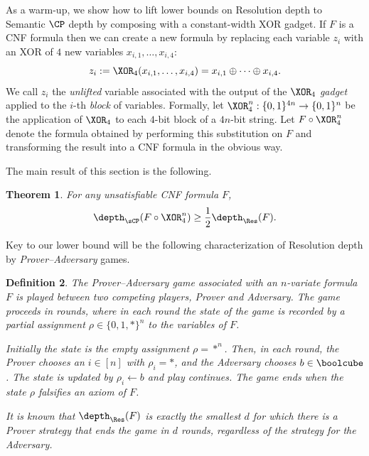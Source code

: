 \documentclass[11pt]{article}
\newtheorem{theorem}{Theorem}[section]
\newtheorem{definition}[theorem]{Definition}
\begin{document}
As a warm-up, we show how to lift lower bounds on Resolution depth to Semantic $\CP$ depth by composing with a constant-width XOR gadget.
If $F$ is a CNF formula then we can create a new formula by replacing each variable $z_i$ with an XOR of $4$ new variables $x_{i,1},\ldots, x_{i,4}$:
\[z_i := \XOR_4(x_{i,1},\ldots, x_{i,4}) = x_{i,1} \oplus \cdots \oplus x_{i,4}. \] 
We call $z_i$ the \emph{unlifted} variable associated with the output of the $\XOR_4$ \emph{gadget} applied to the $i$-th \emph{block} of variables. 
Formally, let $\XOR_4^n:\{0,1\}^{4n} \rightarrow \{0,1\}^n$ be the application of $\XOR_4$ to each $4$-bit block of a $4n$-bit string. 
Let $F \circ \XOR_4^n$ denote the formula obtained by performing this substitution on $F$ and transforming the result into a CNF formula in the obvious way.

The main result of this section is the following.
\begin{theorem}\label{thm:cp-depth-lifting}
	For any unsatisfiable CNF formula $F$, \[\depth_{\sCP}(F\circ \XOR_4^n) \geq \frac{1}{2} \depth_{\Res}(F).\]
\end{theorem}

Key to our lower bound will be the following characterization of Resolution depth by \emph{Prover--Adversary} games.

\begin{definition}\label{def:prover-adversary}
	The \emph{Prover--Adversary} game associated with an $n$-variate formula $F$ is played between two competing players, Prover and Adversary. 
	The game proceeds in rounds, where in each round the state of the game is recorded by a partial assignment $\rho\in\{0,1,*\}^n$ to the variables of $F$. 

	Initially the state is the empty assignment $\rho=*^n$. 
	Then, in each round, the Prover chooses an $i \in [n]$ with $\rho_i = *$, and the Adversary chooses $b \in \boolcube$.
	The state is updated by $\rho_i \leftarrow b$ and play continues.
	The game ends when the state $\rho$ falsifies an axiom of $F$. 

	It is known \cite{Pudlak00} that $\depth_{\Res}(F)$ is exactly the smallest $d$ for which there is a Prover strategy that ends the game in $d$ rounds, regardless of the strategy for the Adversary.
\end{definition}
\end{document}
